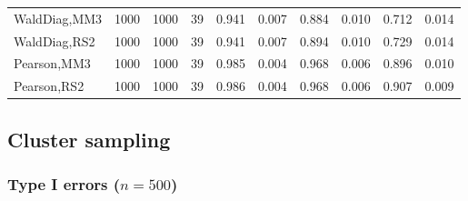 \documentclass[
]{article}
\begin{document}
\begin{table}[H]
{\begin{tabular}[t]{lrrrrrrlrr}
\hspace{1em}WaldDiag,MM3 & 1000 & 1000 & 39 & 0.941 & 0.007 & 0.884 & 0.010 & 0.712 & 0.014\\
\hspace{1em}WaldDiag,RS2 & 1000 & 1000 & 39 & 0.941 & 0.007 & 0.894 & 0.010 & 0.729 & 0.014\\
\hspace{1em}Pearson,MM3 & 1000 & 1000 & 39 & 0.985 & 0.004 & 0.968 & 0.006 & 0.896 & 0.010\\
\hspace{1em}Pearson,RS2 & 1000 & 1000 & 39 & 0.986 & 0.004 & 0.968 & 0.006 & 0.907 & 0.009\\
\bottomrule
\end{tabular}}
\endgroup{}
\end{table}

\hypertarget{cluster-sampling}{%
\subsection{Cluster sampling}\label{cluster-sampling}}

\hypertarget{type-i-errors-n500-2}{%
\subsubsection{\texorpdfstring{Type I errors
(\(n=500\))}{Type I errors (n=500)}}\label{type-i-errors-n500-2}}
\end{document}
